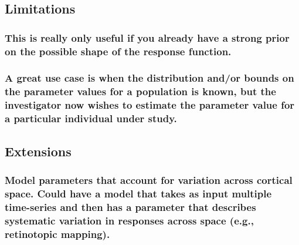 \documentclass[
  man,floatsintext]{apa6}
\begin{document}
\hypertarget{limitations}{%
\subsection{Limitations}\label{limitations}}

\hypertarget{this-is-really-only-useful-if-you-already-have-a-strong-prior-on-the-possible-shape-of-the-response-function.}{%
\subsubsection{This is really only useful if you already have a strong prior on the possible shape of the response function.}\label{this-is-really-only-useful-if-you-already-have-a-strong-prior-on-the-possible-shape-of-the-response-function.}}

\hypertarget{a-great-use-case-is-when-the-distribution-andor-bounds-on-the-parameter-values-for-a-population-is-known-but-the-investigator-now-wishes-to-estimate-the-parameter-value-for-a-particular-individual-under-study.}{%
\subsubsection{A great use case is when the distribution and/or bounds on the parameter values for a population is known, but the investigator now wishes to estimate the parameter value for a particular individual under study.}\label{a-great-use-case-is-when-the-distribution-andor-bounds-on-the-parameter-values-for-a-population-is-known-but-the-investigator-now-wishes-to-estimate-the-parameter-value-for-a-particular-individual-under-study.}}

\hypertarget{extensions}{%
\subsection{Extensions}\label{extensions}}

\hypertarget{model-parameters-that-account-for-variation-across-cortical-space.-could-have-a-model-that-takes-as-input-multiple-time-series-and-then-has-a-parameter-that-describes-systematic-variation-in-responses-across-space-e.g.-retinotopic-mapping.}{%
\subsubsection{Model parameters that account for variation across cortical space. Could have a model that takes as input multiple time-series and then has a parameter that describes systematic variation in responses across space (e.g., retinotopic mapping).}\label{model-parameters-that-account-for-variation-across-cortical-space.-could-have-a-model-that-takes-as-input-multiple-time-series-and-then-has-a-parameter-that-describes-systematic-variation-in-responses-across-space-e.g.-retinotopic-mapping.}}
\end{document}
